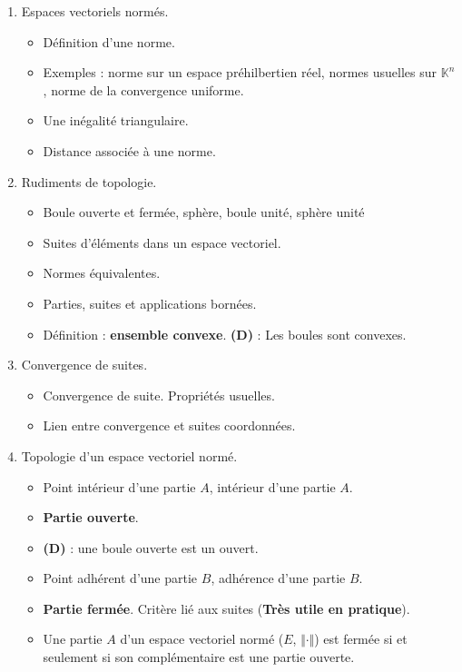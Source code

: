 \documentclass[twoside,a4paper,french,10pt]{VcCours}
\begin{document}
    \begin{enumerate}
    \item Espaces vectoriels normés.
    \begin{itemize}
    \item Définition d'une norme.
    \item Exemples : norme sur un espace préhilbertien réel, normes usuelles sur $\mathbb{K}^n$, norme de la convergence uniforme.
    \item Une inégalité triangulaire.
    \item Distance associée à une norme. 
    \end{itemize}
    \item Rudiments de topologie.
    \begin{itemize}
    \item Boule ouverte et fermée, sphère, boule unité, sphère unité
    \item Suites d'éléments dans un espace vectoriel.
    \item Normes équivalentes.
    \item Parties, suites et applications bornées.
    \item Définition : \textbf{ensemble convexe}. \textbf{(D)} : Les boules sont convexes. 
    \end{itemize}
    \item Convergence de suites.
    \begin{itemize}
    \item Convergence de suite. Propriétés usuelles.
    \item Lien entre convergence et suites coordonnées.
    \end{itemize}
    \item Topologie d'un espace vectoriel normé.
    \begin{itemize}
    \item Point intérieur d'une partie $A$, intérieur d'une partie $A$.
    \item \textbf{Partie ouverte}.
    \item \textbf{(D)} : une boule ouverte est un ouvert.
    \item Point adhérent d'une partie $B$, adhérence d'une partie $B$.
    \item \textbf{Partie fermée}. Critère lié aux suites (\textbf{Très utile en pratique}).
    \item Une partie $A$ d'un espace vectoriel normé ($E$, $\Vert \cdot \Vert$) est fermée si et seulement si son complémentaire est une partie ouverte.

\end{itemize}
\end{enumerate}
\end{document}
